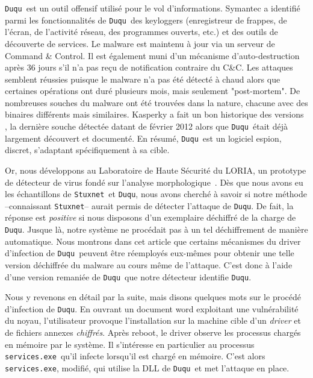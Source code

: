 \documentclass[times,11pt,fullpage]{article}
\newcommand{\Duqu}{\texttt{Duqu}}
\newcommand{\Stuxnet}{\texttt{Stuxnet}}
\newcommand{\netpDLL}{\texttt{NETP191.PNF}}
\newcommand{\service}{\texttt{services.exe}}
\begin{document}
\Duqu\ est un outil offensif utilisé pour le vol d'informations. Symantec \cite{AThierry_SymantecDuqu2011} a identifié parmi les fonctionnalités de \Duqu\ des keyloggers (enregistreur de frappes, de l'écran, de l'activité réseau, des programmes ouverts, etc.) et des outils de découverte de services. Le malware est maintenu à jour via un serveur de Command \& Control. Il est également muni d'un mécanisme d'auto-destruction après 36 jours s'il n'a pas reçu de notification contraire du C\&C. 
Les attaques semblent réussies puisque le malware n'a pas été détecté à chaud alors que certaines opérations ont duré plusieurs mois, mais seulement "post-mortem".
De nombreuses souches du malware ont été trouvées dans la nature, chacune avec des binaires différents mais similaires. Kasperky a fait un bon historique des versions \cite{AThierry_KaspDuqu10}, la dernière souche détectée datant de février 2012 alors que \Duqu\ était déjà largement découvert et documenté.
En résumé, \Duqu\ est un logiciel espion, discret, s'adaptant spécifiquement à sa cible. 

Or, nous développons au Laboratoire de Haute Sécurité du LORIA, un prototype de détecteur de virus fondé sur l'analyse morphologique~\cite{BKM08}.  Dès que nous avons eu les échantillons de \Stuxnet\ et \Duqu, nous avons cherché à savoir si notre méthode --connaissant \Stuxnet-- aurait permis de détecter l'attaque de \Duqu. De fait, la réponse est \emph{positive} si nous disposons d'un exemplaire déchiffré de la charge de \Duqu. Jusque là, notre système ne procédait pas à un tel déchiffrement de manière automatique. Nous montrons dans cet article que certains mécanismes du driver d'infection de \Duqu\ peuvent être réemployés eux-mêmes pour obtenir une telle version déchiffrée du malware au cours même de l'attaque. C'est donc à l'aide d'une version remaniée de \Duqu\ que notre détecteur identifie \Duqu.

Nous y revenons en détail par la suite, mais disons quelques mots sur le procédé d'infection de \Duqu. En ouvrant un document {\sc word} exploitant une vulnérabilité du noyau, l'utilisateur provoque l'installation sur la machine cible d'un \emph{driver} et de fichiers annexes \emph{chiffrés}. %
Après reboot, le driver observe les processus chargés en mémoire par le système. Il s'intéresse en particulier au processus \service\ qu'il infecte lorsqu'il est chargé en mémoire. C'est alors \service, modifié, qui utilise la DLL de \Duqu\ et met l'attaque en place.
\end{document}
